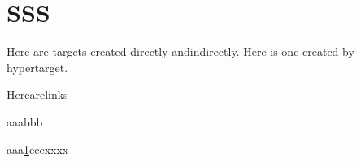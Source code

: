 \documentclass[a4paper,12pt]{book}
\makeatletter
\newcommand{\linkdest}[1]{\Hy@raisedlink{\hypertarget{#1}{}}}
\makeatother
\begin{document}
  \section{SSS}
  \label{sec:sn.1.1}
 \lipsum[1]

 Here are targets created
 \makeatletter
  directly
 \makeatother
 andindirectly.  Here is one created by \hypertarget{t3}{}hypertarget.

 \hyperlink{t1}{Here}\hyperlink{t.2}{are}\hyperlink{t3}{links}


  aaa\linkdest{t.2}bbb

 \lipsum[1-10]
 aaa\ref{sec:sn.1.1}{ccc}xxxx
\lipsum[1]
\end{document}
